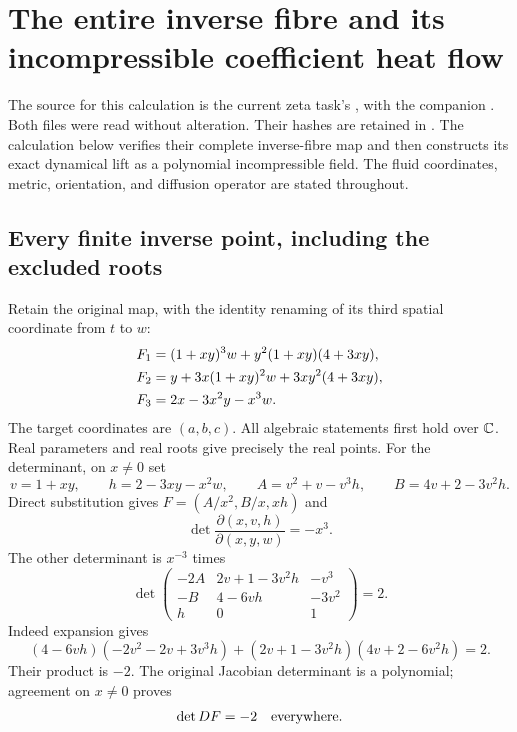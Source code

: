 \section{The entire inverse fibre and its incompressible coefficient heat flow}
\label{sec:inverse-fibre-heat}

The source for this calculation is the current zeta task's
, with the companion
.
Both files were read without alteration. Their hashes are retained in
.
The calculation below verifies their complete inverse-fibre map and then
constructs its exact dynamical lift as a polynomial incompressible field.
The fluid coordinates, metric, orientation, and diffusion operator are stated
throughout.

\subsection{Every finite inverse point, including the excluded roots}

Retain the original map, with the identity renaming of its third spatial
coordinate from $t$ to $w$:
\begin{align}
 F_1&=(1+xy)^3w+y^2(1+xy)(4+3xy),\notag\\
 F_2&=y+3x(1+xy)^2w+3xy^2(4+3xy),\notag\\
 F_3&=2x-3x^2y-x^3w. \label{eq:ifh-original}
\end{align}
The target coordinates are $(a,b,c)$. All algebraic statements first hold
over $\mathbb C$. Real parameters and real roots give precisely the real points.
For the determinant, on $x\ne0$ set
\[
 v=1+xy,\qquad h=2-3xy-x^2w,\qquad
 A=v^2+v-v^3h,\qquad B=4v+2-3v^2h.
\]
Direct substitution gives $F=(A/x^2,B/x,xh)$ and
\[
 \det\frac{\partial(x,v,h)}{\partial(x,y,w)}=-x^3.
\]
The other determinant is $x^{-3}$ times
\[
 \det\begin{pmatrix}
 -2A&2v+1-3v^2h&-v^3\\
 -B&4-6vh&-3v^2\\h&0&1
 \end{pmatrix}=2.
\]
Indeed expansion gives
\[
 (4-6vh)(-2v^2-2v+3v^3h)
 +(2v+1-3v^2h)(4v+2-6v^2h)=2.
\]
Their product is $-2$. The original Jacobian determinant is a polynomial;
agreement on $x\ne0$ proves
\begin{equation}
 \det DF=-2\quad\hbox{everywhere}. \label{eq:ifh-det}
\end{equation}


